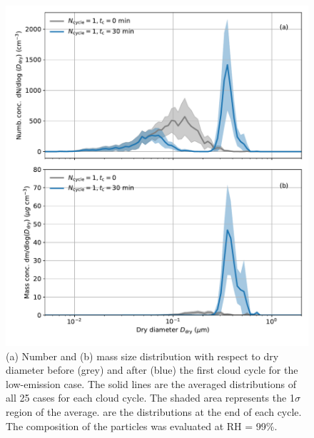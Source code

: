 \documentclass[edeposit,fullpage]{uiucthesis2009}
\begin{document}
  \begin{figure}
    \centering
    \includegraphics[scale=0.5]{chap3_figs/fig_sup2.pdf}
    \caption{(a) Number and (b) mass size distribution with respect to
      dry diameter before (grey) and after (blue) the first cloud
      cycle for the low-emission case.  The solid lines are the
      averaged distributions of all 25 cases for each cloud cycle. The
      shaded area represents the 1$\sigma$ region of the average.  are
      the distributions at the end of each cycle. The composition of
      the particles was evaluated at RH = 99\%.}
    \label{fig:sup2}
\end{figure}
\end{document}

